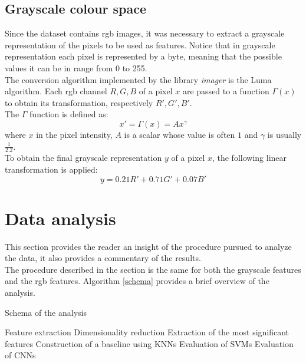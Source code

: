 \documentclass{article}
\begin{document}
\subsection{Grayscale colour space}
Since the dataset contains rgb images, it was necessary to extract a grayscale representation of the pixels to be used as features. Notice that in grayscale representation each pixel is represented by a byte, meaning that the possible values it can be in range from 0 to 255. \\
The conversion algorithm implemented by the library \textit{imager} is the Luma algorithm. Each rgb channel $R, G, B$ of a pixel $x$ are passed to a function $\Gamma(x)$ to obtain its transformation, respectively $R', G', B'$. \\
The $\Gamma$ function is defined as: 
\begin{equation}
 x' = \Gamma(x) = Ax^{\gamma}
\end{equation}
where $x$ in the pixel intensity, $A$ is a scalar whose value is often $1$ and $\gamma$ is usually $\frac{1}{2.2}$.\\
To obtain the final grayscale representation $y$ of a pixel $x$, the following linear transformation is applied:
\begin{equation}
 y = 0.21 R' + 0.71 G' + 0.07  B'
\end{equation}
\cite{grayscaleconversion}
\section{Data analysis}
This section provides the reader an insight of the procedure pursued to analyze the data, it also provides a commentary of the results.\\
The procedure described in the section is the same for both the grayscale features and the rgb features. Algorithm \ref{schema} provides a brief overview of the analysis.

\begin{algorithm}[H] 
   \caption{Schema of the analysis} \label{schema}
    \begin{algorithmic}[1]
    \State Feature extraction
    \State Dimensionality reduction
    \State Extraction of the most significant features
    \State Construction of a baseline using KNNs
    \State Evaluation of SVMs
    \State Evaluation of CNNs
\end{algorithmic}
\end{algorithm}
\end{document}
